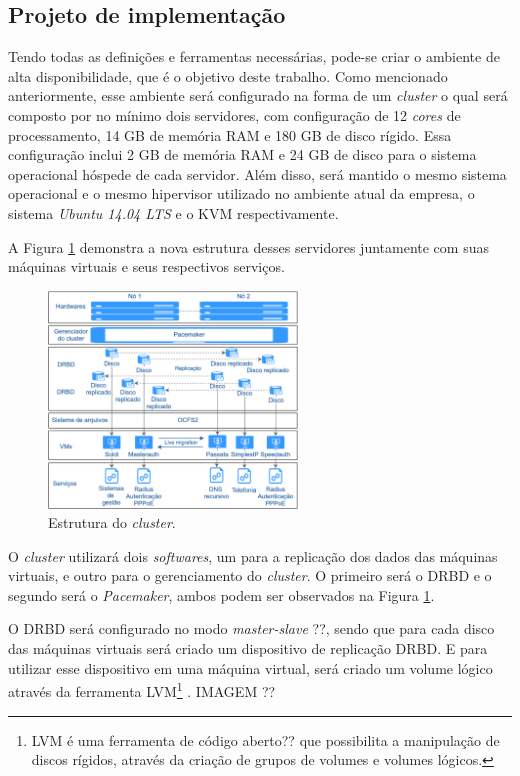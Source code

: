 \subsection{Projeto de implementação}
\label{section:projetoimpl}

Tendo todas as definições e ferramentas necessárias, pode-se criar o ambiente de alta disponibilidade, que é o objetivo deste trabalho.
Como mencionado anteriormente, esse ambiente será configurado na forma de um \textit{cluster} o qual será composto por no mínimo dois servidores, 
com configuração de 12 \textit{cores} de processamento, 14 GB de memória \ac{RAM} e 180 GB de disco rígido. Essa configuração inclui
2 GB de memória \ac{RAM} e 24 GB de disco para o sistema operacional hóspede de cada servidor. Além disso, será mantido o mesmo sistema operacional 
e o mesmo hipervisor utilizado no ambiente atual da empresa, o sistema \textit{Ubuntu 14.04 \ac{LTS}} e o \ac{KVM} respectivamente.

A Figura \ref{fig:projeto_estrutura} demonstra a nova estrutura desses servidores juntamente com suas máquinas virtuais e seus respectivos 
serviços.
\begin{figure}[h!]
 \centering
 \includegraphics[width=250px]{img/projeto_estrutura.eps}
 \caption{Estrutura do \textit{cluster}.}
 \label{fig:projeto_estrutura}
\end{figure}

O \textit{cluster} utilizará dois \textit{softwares}, um para a replicação dos dados das máquinas virtuais, e outro para o gerenciamento do 
\textit{cluster}. O primeiro será o \ac{DRBD} e o segundo será o \textit{Pacemaker}, ambos podem ser observados na Figura 
\ref{fig:projeto_estrutura}.

O \ac{DRBD} será configurado no modo \textit{master-slave} ??, sendo que para cada disco das máquinas virtuais será criado um dispositivo de 
replicação \ac{DRBD}. E para utilizar esse dispositivo em uma máquina virtual, será criado um volume lógico através da ferramenta 
\ac{LVM}\footnote{LVM é uma ferramenta de código aberto?? que possibilita a manipulação de discos rígidos, através da criação de grupos de volumes 
e volumes lógicos.} \cite{lvm}. 
IMAGEM ??


